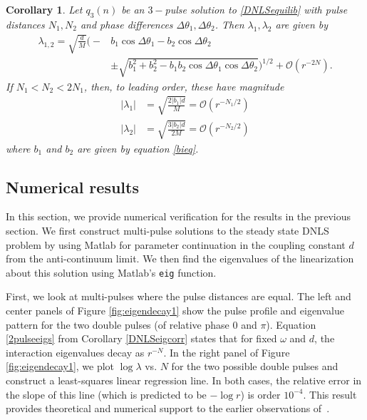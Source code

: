 \documentclass[12pt]{elsarticle}
\newtheorem{corollary}{Corollary}
\begin{document}
\begin{corollary}\label{DNLSeigcorr2}
Let $q_3(n)$ be an $3-$pulse solution to \eqref{DNLSequilib} with pulse distances $N_1, N_2$ and phase differences $\Delta \theta_1, \Delta \theta_2$. Then $\lambda_1, \lambda_2$ are given by
\begin{equation}\label{3pulseeigs}
\begin{aligned}
\lambda_{1,2} = \sqrt{\frac{d}{M}}
\Big( -&b_1\cos\Delta\theta_1 - b_2\cos\Delta\theta_2  \\
&\pm \sqrt{b_1^2 + b_2^2 - b_1 b_2\cos\Delta\theta_1 \cos\Delta\theta_2} \Big)^{1/2} + \mathcal{O}(r^{-2N}).
\end{aligned}
\end{equation}
If $N_1 < N_2 < 2 N_1$, then, to leading order, these have magnitude
\begin{equation}\label{3pulsemag}
\begin{aligned}
|\lambda_1| &= \sqrt{\frac{2 |b_1| d}{M}} = \mathcal{O}(r^{-N_1/2}) \\
|\lambda_2| &= \sqrt{\frac{3 |b_2| d}{2 M}} = \mathcal{O}(r^{-N_2/2})
\end{aligned}
\end{equation}
where $b_1$ and $b_2$ are given by equation \eqref{bieq}.
\end{corollary}

\subsection{Numerical results}

In this section, we provide numerical verification for the results in the previous section. We first construct multi-pulse solutions to the steady state DNLS problem by using Matlab for parameter continuation in the coupling constant $d$ from the anti-continuum limit. We then find the eigenvalues of the linearization about this solution using Matlab's \texttt{eig} function. 

First, we look at multi-pulses where the pulse distances are equal.  The left and center panels of Figure \ref{fig:eigendecay1} show the pulse profile and eigenvalue pattern for the two double pulses (of relative
phase $0$ and $\pi$). Equation \eqref{2pulseeigs} from Corollary \ref{DNLSeigcorr} states that for fixed $\omega$ and $d$, the interaction eigenvalues decay as $r^{-N}$. In the right panel of Figure \ref{fig:eigendecay1}, we plot $\log \lambda$ vs. $N$ for the two possible double pulses and construct a least-squares linear regression line. In both cases, the relative error in the slope of this line (which is predicted to be $-\log r$) is order $10^{-4}$. This result provides theoretical and numerical support to the earlier observations of~\cite{Kapitula2001a}.
\end{document}
